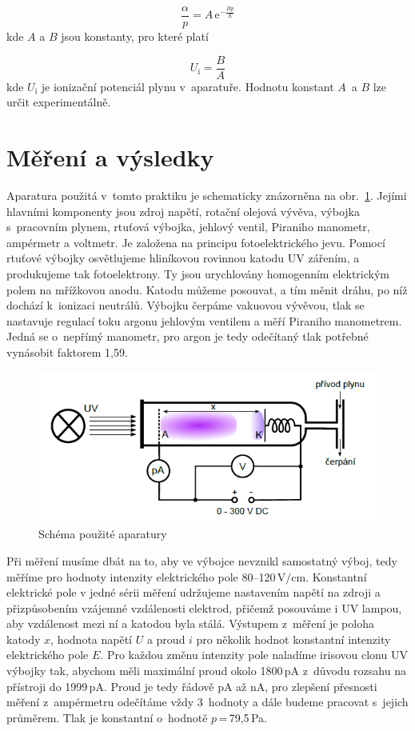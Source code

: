 \documentclass[a4paper,12pt]{article}
\newcommand{\e}{\text{e}}
\begin{document}
\begin{equation}
	\frac{\alpha}{p} = A\,\e^{-\frac{Bp}{E}} 
	\label{5}
\end{equation}
kde $A$ a $B$ jsou konstanty, pro které platí

\begin{equation}
	U_\text{i} = \frac{B}{A}
	\label{6}
\end{equation}
kde $U_\text{i}$ je ionizační potenciál plynu v~aparatuře. Hodnotu konstant $A$~a $B$ 
lze určit experimentálně.

\section{Měření a výsledky}

Aparatura použitá v~tomto praktiku je schematicky znázorněna na 
obr.~\ref{aparatura}. Jejími hlavními komponenty jsou zdroj napětí, rotační 
olejová vývěva, výbojka s~pracovním plynem, rtuťová výbojka, jehlový ventil, Piraniho manometr, ampérmetr a 
voltmetr. Je založena na principu fotoelektrického jevu. Pomocí rtuťové výbojky 
osvětlujeme hliníkovou rovinnou katodu UV zářením, a produkujeme tak 
fotoelektrony. Ty jsou urychlovány homogenním elektrickým polem na mřížkovou 
anodu. Katodu můžeme posouvat, a tím měnit dráhu, po níž dochází k~ionizaci 
neutrálů. Výbojku čerpáme vakuovou vývěvou, tlak 
se nastavuje regulací toku argonu jehlovým ventilem a měří Piraniho manometrem. Jedná se o~nepřímý 
manometr, pro argon je tedy odečítaný tlak potřebné vynásobit 
faktorem 1,59.
\begin{figure}[h]
	\centering
	\includegraphics[width=130mm]{aparatura.png}
	\caption{Schéma použité aparatury}
	\label{aparatura}
\end{figure}

Při měření musíme dbát na to, aby ve výbojce nevznikl samostatný výboj, tedy 
měříme pro hodnoty intenzity elektrického pole 80--120\,$\text{V/cm}$. 
Konstantní elektrické pole v jedné sé\-ri\-i měření udržujeme nastavením napětí 
na 
zdroji a přizpůsobením vzájemné vzdálenosti elektrod, přičemž posouváme i UV 
lampou, aby vzdálenost mezi ní a katodou byla stálá. Výstupem z~měření je 
poloha katody $x$, hodnota napětí $U$ 
a proud $i$ pro několik hodnot konstantní intenzity elektrického pole $E$. Pro 
každou změnu intenzity pole naladíme irisovou clonu UV výbojky tak, abychom 
měli maximální proud okolo 1800\,pA z~důvodu rozsahu na přístroji do 1999\,pA. 
Proud je tedy řádově pA až nA, pro zlepšení přesnosti měření z~ampérmetru 
odečítáme vždy 3~hodnoty a dále budeme pracovat s~jejich průměrem. Tlak je 
konstantní o~hodnotě $p$\,=\,79,5\,Pa.
\end{document}
